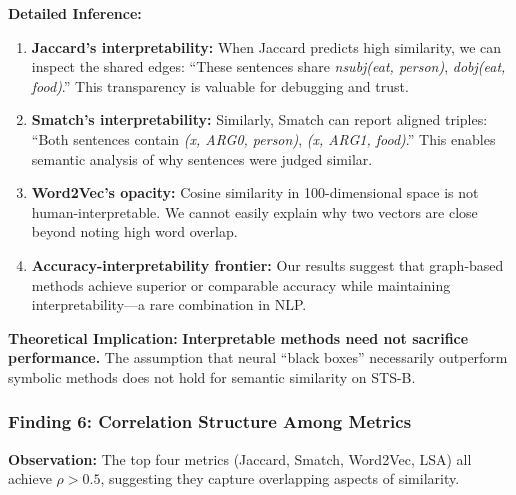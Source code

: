 \documentclass[11pt,a4paper]{article}
\begin{document}
\textbf{Detailed Inference:}
\begin{enumerate}
    \item \textbf{Jaccard's interpretability:} When Jaccard predicts high similarity, we can inspect the shared edges: ``These sentences share \textit{nsubj(eat, person)}, \textit{dobj(eat, food)}.'' This transparency is valuable for debugging and trust.
    
    \item \textbf{Smatch's interpretability:} Similarly, Smatch can report aligned triples: ``Both sentences contain \textit{(x, ARG0, person)}, \textit{(x, ARG1, food)}.'' This enables semantic analysis of why sentences were judged similar.
    
    \item \textbf{Word2Vec's opacity:} Cosine similarity in 100-dimensional space is not human-interpretable. We cannot easily explain why two vectors are close beyond noting high word overlap.
    
    \item \textbf{Accuracy-interpretability frontier:} Our results suggest that graph-based methods achieve superior or comparable accuracy while maintaining interpretability---a rare combination in NLP.
\end{enumerate}

\textbf{Theoretical Implication:} \textbf{Interpretable methods need not sacrifice performance.} The assumption that neural ``black boxes'' necessarily outperform symbolic methods does not hold for semantic similarity on STS-B.

\subsubsection{Finding 6: Correlation Structure Among Metrics}

\textbf{Observation:} The top four metrics (Jaccard, Smatch, Word2Vec, LSA) all achieve $\rho > 0.5$, suggesting they capture overlapping aspects of similarity.
\end{document}
